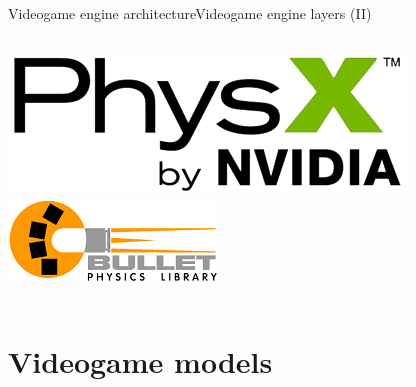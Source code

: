 \documentclass[10pt,compress]{beamer} %
\begin{document}
\begin{frame}{Videogame engine architecture}{Videogame engine layers (II)}
\begin{columns}
			\centering\includegraphics[width=0.9\linewidth]{figs/physx.png}\\\smallskip
			\centering\includegraphics[width=0.9\linewidth]{figs/bullet}
	\end{columns}
\end{frame}



\section{Videogame models}
\end{document}
